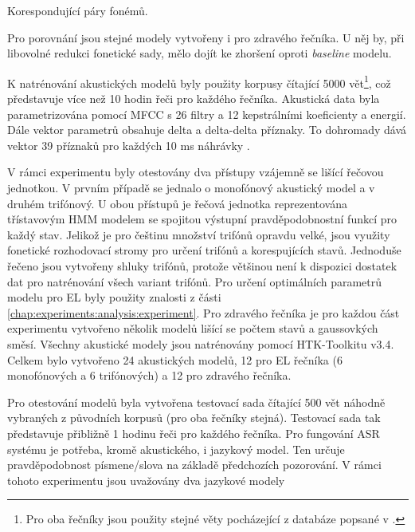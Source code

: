 \begin{table}[htpb]
  \centering
  \def\arraystretch{1.5}
  \caption{Korespondující páry fonémů.}
  \label{tab:experiments:analysis:reduction:pairs}
\end{table}

\noindent Pro porovnání jsou stejné modely vytvořeny i pro zdravého řečníka. U něj by, při libovolné redukci fonetické sady, mělo dojít ke zhoršení oproti \textit{baseline} modelu.

K natrénování akustických modelů byly použity korpusy čítající 5000 vět\footnote{Pro oba řečníky jsou použity stejné věty pocházející z databáze popsané v \cite{Radova2000}.}, což představuje více než 10 hodin řeči pro každého řečníka. Akustická data byla parametrizována pomocí MFCC s 26 filtry a 12 kepstrálními koeficienty a energií. Dále vektor parametrů obsahuje delta a delta-delta příznaky. To dohromady dává vektor 39 příznaků pro každých 10 ms náhrávky \cite{Psutka2007}.

V rámci experimentu byly otestovány dva přístupy vzájemně se lišící řečovou jednotkou. V prvním případě se jednalo o monofónový akustický model a v druhém trifónový. U obou přístupů je řečová jednotka reprezentována třístavovým HMM modelem se spojitou výstupní pravděpodobnostní funkcí pro každý stav. Jelikož je pro češtinu množství trifónů opravdu velké, jsou využity fonetické rozhodovací stromy pro určení trifónů a korespujících stavů. Jednoduše řečeno jsou vytvořeny shluky trifónů, protože většinou není k dispozici dostatek dat pro natrénování všech variant trifónů. Pro určení optimálních parametrů modelu pro EL byly použity znalosti z části \ref{chap:experiments:analysis:experiment}. Pro zdravého řečníka je pro každou část experimentu vytvořeno několik modelů lišící se počtem stavů a gaussovkých směsí. Všechny akustické modely jsou natrénovány pomocí HTK-Toolkitu v3.4. Celkem bylo vytvořeno 24 akustických modelů, 12 pro EL řečníka (6 monofónových a 6 trifónových) a 12 pro zdravého řečníka.

Pro otestování modelů byla vytvořena testovací sada čítající 500 vět náhodně vybraných z původních korpusů (pro oba řečníky stejná). Testovací sada tak představuje přibližně 1 hodinu řeči pro každého řečníka. Pro fungování ASR systému je potřeba, kromě akustického, i jazykový model. Ten určuje pravděpodobnost písmene/slova na základě předchozích pozorování. V rámci tohoto experimentu jsou uvažovány dva jazykové modely

